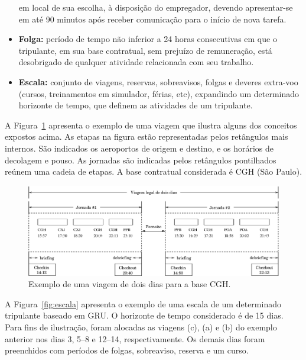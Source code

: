 \documentclass[12pt,a4paper]{article}
\begin{document}
\begin{itemize}
	em local de sua escolha, à disposição do empregador, devendo apresentar-se em até 90 minutos após 
	receber comunicação para o início de nova tarefa.
	\item {\bf Folga:} período de tempo não inferior a 24 horas consecutivas em que o tripulante, em 
	sua base contratual, sem prejuízo de remuneração, está desobrigado de qualquer atividade
	relacionada com seu trabalho.
	\item {\bf Escala:} conjunto de viagens, reservas, sobreavisos, folgas e deveres extra-voo
	(cursos, treinamentos em simulador, férias, etc), expandindo um determinado horizonte de tempo, 
	que definem as atividades de um tripulante. 
\end{itemize}

A Figura~\ref{fig:viagem} apresenta o exemplo de uma viagem que ilustra alguns dos conceitos
expostos acima. As etapas na figura estão representadas pelos retângulos mais internos. São
indicados os aeroportos de origem e destino, e os horários de decolagem e pouso. As
jornadas são indicadas pelos retângulos pontilhados reúnem uma cadeia de etapas. A base contratual
considerada é CGH (São Paulo). 

\begin{figure}[htbp]
	\begin{center}
		\includegraphics[scale=0.5]{fig/viagem.eps}
		\caption{Exemplo de uma viagem de dois dias para a base CGH.}
		\label{fig:viagem}
	\end{center}
\end{figure}

A Figura~\ref{fig:escala} apresenta o exemplo de uma escala de um determinado tripulante baseado em
GRU. O horizonte de tempo considerado é de 15 dias. Para fins de ilustração, foram alocadas as
viagens (c), (a) e (b) do exemplo anterior nos dias 3, 5--8 e 12--14, respectivamente. Os demais
dias foram preenchidos com períodos de folgas, sobreaviso, reserva e um curso.
\end{document}
